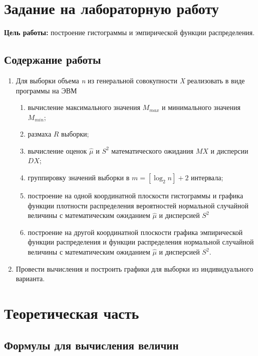 \chapter{Задание на лабораторную работу}

\textbf{Цель работы:} построение гистограммы и эмпирической функции распределения.

\section{Содержание работы}

\begin{enumerate}
    \item Для выборки объема \textit{n} из генеральной совокупности \textit{X} реализовать в виде программы на ЭВМ

    \begin{enumerate}
        \item вычисление максимального значения $M_{max}$ и минимального значения $M_{min}$;
        \item размаха $R$ выборки;
        \item вычисление оценок $\hat\mu$ и $S^2$ математического ожидания $MX$ и дисперсии $DX$;
        \item группировку значений выборки в $m = [\log_2 n] + 2$ интервала;
        \item построение на одной координатной плоскости гистограммы и графика функции плотности распределения вероятностей нормальной случайной величины с математическим ожиданием $\hat{\mu}$ и дисперсией $S^2$
        \item построение на другой координатной плоскости графика эмпирической функции распределения и функции распределения нормальной случайной величины с математическим ожиданием $\hat{\mu}$ и дисперсией $S^2$.
    \end{enumerate}

    \item Провести вычисления и построить графики для выборки из индивидуального варианта.
\end{enumerate}


\chapter{Теоретическая часть}

\section{Формулы для вычисления величин}

